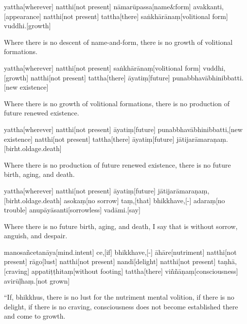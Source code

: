 \begin{samepage}
\begingl[glneveryline={\PaliGlossA,\PaliGlossB}]
yattha[wherever] natthi[not present] nāmarūpassa[name\&form] avakkanti,[appearance] natthi[not present] tattha[there] saṅkhārānaṃ[volitional form] vuddhi.[growth]
\endgl
\nopagebreak
\linespread{0.5}
\begin{spacin}{0.2}
{\PaliGlossFT Where there is no descent of name-and-form, there is no growth of volitional formations.}
\end{spacin}
\vskip 12pt
\end{samepage}
\begin{samepage}
\begingl[glneveryline={\PaliGlossA,\PaliGlossB}]
yattha[wherever] natthi[not present] saṅkhārānaṃ[volitional form] vuddhi,[growth] natthi[not present] tattha[there] āyatiṃ[future] punabbhavābhinibbatti.[new existence]
\endgl
\nopagebreak
\linespread{0.5}
\begin{spacin}{0.2}
{\PaliGlossFT Where there is no growth of volitional formations, there is no production of future renewed existence.}
\end{spacin}
\vskip 12pt
\end{samepage}
\begin{samepage}
\begingl[glneveryline={\PaliGlossA,\PaliGlossB}]
yattha[wherever] natthi[not present] āyatiṃ[future] punabbhavābhinibbatti,[new existence] natthi[not present] tattha[there] āyatiṃ[future] jātijarāmaraṇaṃ.[birht.oldage.death]
\endgl
\nopagebreak
\linespread{0.5}
\begin{spacin}{0.2}
{\PaliGlossFT Where there is no production of future renewed existence, there is no future birth, aging, and death.}
\end{spacin}
\vskip 12pt
\end{samepage}
\begin{samepage}
\begingl[glneveryline={\PaliGlossA,\PaliGlossB}]
yattha[wherever] natthi[not present] āyatiṃ[future] jātijarāmaraṇaṃ,[birht.oldage.death] asokaṃ[no sorrow] taṃ,[that] bhikkhave,[-] adaraṃ[no trouble] anupāyāsanti[sorrowless] vadāmi.[say]
\endgl
\nopagebreak
\linespread{0.5}
\begin{spacin}{0.2}
{\PaliGlossFT Where there is no future birth, aging, and death, I say that is without sorrow, anguish, and despair.}
\end{spacin}
\vskip 12pt
\end{samepage}
\vskip 0.2in
\begin{samepage}
\begingl[glneveryline={\PaliGlossA,\PaliGlossB}]
manosañcetanāya[mind.intent] ce,[if] bhikkhave,[-] āhāre[nutriment] natthi[not present] rāgo[lust] natthi[not present] nandī[delight] natthi[not present] taṇhā,[craving] appatiṭṭhitaṃ[without footing] tattha[there] viññāṇaṃ[consciousness] avirūḷhaṃ.[not grown]
\endgl
\nopagebreak
\linespread{0.5}
\begin{spacin}{0.2}
{\PaliGlossFT “If, bhikkhus, there is no lust for the nutriment mental volition, if there is no delight, if there is no craving, consciousness does not become established there and come to growth.}
\end{spacin}
\vskip 12pt
\end{samepage}
